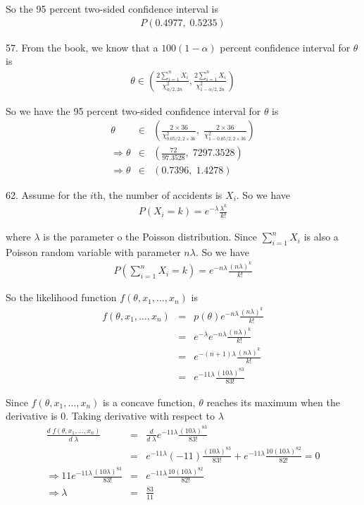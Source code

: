 \documentclass[12pt]{article}
\begin{document}
So the 95 percent two-sided confidence interval is
\begin{eqnarray*}
  P \left(0.4977, \; 0.5235 \right)
\end{eqnarray*}

57. From the book, we know that a $100(1 - \alpha)$ percent confidence interval for $\theta$ is
\begin{eqnarray*}
  \theta \in \left(
    \frac {2 \sum_{i=1}^n X_i}{\chi_{\alpha / 2, 2n}^2}
    , \frac{2 \sum_{i=1}^n X_i}{\chi_{1-\alpha / 2, 2n}^2} \right)
\end{eqnarray*}

So we have the 95 percent two-sided confidence interval for $\theta$ is
\begin{eqnarray*}
  \theta &\in& \left(
    \frac {2 \times 36}{\chi_{0.05 / 2, 2 \times 36}^2}
    , \; \frac {2 \times 36}{\chi_{1-0.05 / 2, 2\times 36}^2} \right) \\
  \Rightarrow \theta  &\in& \left( \frac {72}{97.3528},
    \; {72}{97.3528} \right) \\
    \Rightarrow \theta  &\in& \left( 0.7396, \; 1.4278 \right)
\end{eqnarray*}

62. Assume for the $i$th, the number of accidents is $X_i$. So we have
\begin{eqnarray*}
    P(X_i = k) = e^{-\lambda} \frac {\lambda^k}{k!}
\end{eqnarray*}

where $\lambda$ is the parameter o the Poisson distribution. Since $\sum_{i=1}^n X_i$ is also a Poisson random variable with parameter $n\lambda$. So we have
\begin{eqnarray*}
    P(\sum_{i=1}^n X_i = k) = e^{-n\lambda} \frac {(n\lambda)^k}{k!}
\end{eqnarray*}

So the likelihood function $f(\theta, x_1, \dots, x_n)$ is
\begin{eqnarray*}
    f(\theta, x_1, \dots, x_n)
    &=& p(\theta)e^{-n\lambda} \frac {(n\lambda)^k}{k!} \\
    &=& e^{-\lambda}e^{-n\lambda} \frac {(n\lambda)^k}{k!} \\
    &=& e^{-(n+1)\lambda} \frac {(n\lambda)^k}{k!} \\
    &=& e^{-11\lambda} \frac {(10\lambda)^{83}}{83!}
\end{eqnarray*}

Since $f(\theta, x_1, \dots, x_n)$ is a concave function, $\theta$ reaches its maximum when the derivative is 0. Taking derivative with respect to $\lambda$
\begin{eqnarray*}
    \frac {d \; f(\theta, x_1, \dots, x_n)}{d \; \lambda}
    &=& \frac {d}{d \; \lambda} e^{-11\lambda} \frac {(10\lambda)^{83}}{83!} \\
    &=& e^{-11 \lambda}(-11) \frac {(10\lambda)^{83}}{83!}
    + e^{-11\lambda} \frac {10 (10\lambda)^{82}}{82!} = 0 \\
    \Rightarrow  11 e^{-11 \lambda} \frac {(10\lambda)^{83}}{83!}
    &=& e^{-11\lambda} \frac {10 (10\lambda)^{82}}{82!} \\
    \Rightarrow \lambda &=& \frac {83}{11}
\end{eqnarray*}
\end{document}
